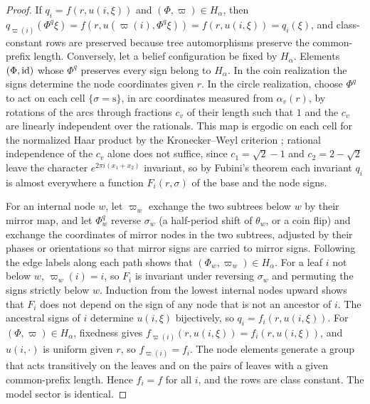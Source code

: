 \begin{proof}
If $q_i=f(r,u(i,\xi))$ and $(\Phi,\varpi)\in H_\alpha$, then $q_{\varpi(i)}(\Phi^q\xi)=f(r,u(\varpi(i),\Phi^q\xi))=f(r,u(i,\xi))=q_i(\xi)$, and class-constant rows are preserved because tree automorphisms preserve the common-prefix length. Conversely, let a belief configuration be fixed by $H_\alpha$. Elements $(\Phi,\mathrm{id})$ whose $\Phi^q$ preserves every sign belong to $H_\alpha$. In the coin realization the signs determine the node coordinates given $r$. In the circle realization, choose $\Phi^q$ to act on each cell $\{\sigma=\mathrm s\}$, in arc coordinates measured from $\alpha_v(r)$, by rotations of the arcs through fractions $c_v$ of their length such that $1$ and the $c_v$ are linearly independent over the rationals. This map is ergodic on each cell for the normalized Haar product by the Kronecker--Weyl criterion \citep[Chapter 1]{Walters1982}; rational independence of the $c_v$ alone does not suffice, since $c_1=\sqrt2-1$ and $c_2=2-\sqrt2$ leave the character $e^{2\pi i(x_1+x_2)}$ invariant, so by Fubini's theorem each invariant $q_i$ is almost everywhere a function $F_i(r,\sigma)$ of the base and the node signs.

For an internal node $w$, let $\varpi_w$ exchange the two subtrees below $w$ by their mirror map, and let $\Phi_w^q$ reverse $\sigma_w$ (a half-period shift of $\theta_w$, or a coin flip) and exchange the coordinates of mirror nodes in the two subtrees, adjusted by their phases or orientations so that mirror signs are carried to mirror signs. Following the edge labels along each path shows that $(\Phi_w,\varpi_w)\in H_\alpha$. For a leaf $i$ not below $w$, $\varpi_w(i)=i$, so $F_i$ is invariant under reversing $\sigma_w$ and permuting the signs strictly below $w$. Induction from the lowest internal nodes upward shows that $F_i$ does not depend on the sign of any node that is not an ancestor of $i$. The ancestral signs of $i$ determine $u(i,\xi)$ bijectively, so $q_i=f_i(r,u(i,\xi))$. For $(\Phi,\varpi)\in H_\alpha$, fixedness gives $f_{\varpi(i)}(r,u(i,\xi))=f_i(r,u(i,\xi))$, and $u(i,\cdot)$ is uniform given $r$, so $f_{\varpi(i)}=f_i$. The node elements generate a group that acts transitively on the leaves and on the pairs of leaves with a given common-prefix length. Hence $f_i=f$ for all $i$, and the rows are class constant. The model sector is identical.
\end{proof}

